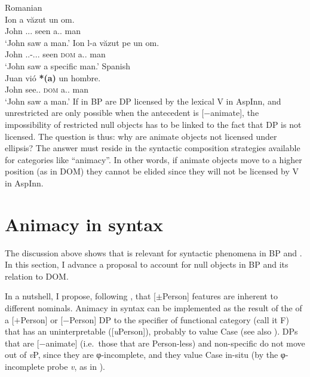 \documentclass[output=paper]{langsci/langscibook}
\begin{document}
\ea\label{ex:27.24} Romanian\\
    \ea
        \gll Ion         a                                 văzut un         om.\\
             John        \Aux.\Tsg{}.\Prs{}.\Indic{}      seen a.\M.\Sg{}    man\\
        \glt `John saw a man.'
    \ex
        \gll Ion       l-a văzut pe un om.\\
        John     \Cl.\Tsg.\M-\Aux.\Tsg{}.\Prs.\Indic{} seen \textsc{dom} a.\M.\Sg{} man\\
        \glt `John saw a specific man.'
    \z
\ex\label{ex:27.25} Spanish\\
    \gll Juan    vió \textbf{*(a)} un hombre.\\
        John    see.\Pst.\Tsg{}  \hphantom{\textbf{*(}}\textsc{dom} a.\M.\Sg{}    man\\
    \glt `John saw a man.'
\z
If  in \gls{BP} are DP  licensed
by the lexical V in AspInn, and unrestricted  are only possible
when the antecedent is [$-$animate], the impossibility of restricted null
objects has to be linked to the fact that DP  is not licensed. The
question is thus: why are animate objects not licensed under ellipsis? The
answer must reside in the syntactic composition strategies available for
categories like \enquote{animacy}. In other words, if animate objects move to a
higher position (as in DOM) they cannot be
elided since they will not be licensed by V in AspInn.

\section{Animacy in syntax}\label{sec:27.3}

The discussion above shows that  is relevant for syntactic phenomena in
BP and . In this section, I advance a proposal to account for null
objects in \gls{BP} and its relation to DOM\@.

In a nutshell, I propose, following \citet{Richards2008}, that [$\pm$Person]
features are inherent to different nominals. Animacy in syntax can be
implemented as the result of the  of a [$+$Person] or [$-$Person]
DP to the specifier of functional category (call it F\tss{[Person]}) that has
an uninterpretable ([\emph{u}Person]), probably to value Case (see also
\citealt{OrdonezRoca2017}). DPs that are [$-$animate] (i.e.\ those that are
Person-less) and non-specific do not move out of \emph{v}P, since they are
φ-incomplete, and they value Case in-situ (by the φ-incomplete probe \emph{v},
as in \citealt{Rodriguez-Mondonedo2007}).
\end{document}
